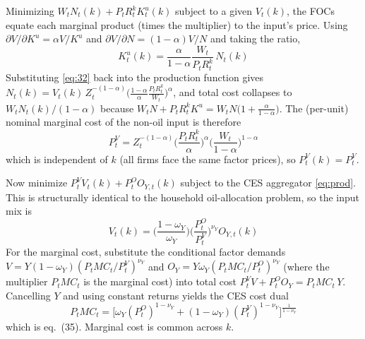 Minimizing $W_tN_t(k)+P_tR^k_tK^u_t(k)$ subject to a given $V_t(k)$, the FOCs equate each marginal
product (times the multiplier) to the input's price. Using $\partial V/\partial K^u=\alpha V/K^u$ and
$\partial V/\partial N=(1-\alpha)V/N$ and taking the ratio,
\begin{equation}\label{eq:32}
\boxed{\,K^u_t(k)=\frac{\alpha}{1-\alpha}\frac{W_t}{P_tR^k_t}\,N_t(k)\,}\tag{P-32}
\end{equation}
Substituting \eqref{eq:32} back into the production function gives
$N_t(k)=V_t(k)\,Z_t^{-(1-\alpha)}\big(\tfrac{1-\alpha}{\alpha}\tfrac{P_tR^k_t}{W_t}\big)^{\alpha}$, and
total cost collapses to $W_tN_t(k)/(1-\alpha)$ because
$W_tN+P_tR^k_tK^u=W_tN\big(1+\tfrac{\alpha}{1-\alpha}\big)$. The (per-unit) nominal marginal cost of
the non-oil input is therefore
\begin{equation}\label{eq:33}
\boxed{\,P^V_t=Z_t^{-(1-\alpha)}\Big(\frac{P_tR^k_t}{\alpha}\Big)^\alpha\Big(\frac{W_t}{1-\alpha}\Big)^{1-\alpha}\,}\tag{P-33}
\end{equation}
which is independent of $k$ (all firms face the same factor prices), so $P^V_t(k)=P^V_t$.

Now minimize $P^V_tV_t(k)+P^O_tO_{Y,t}(k)$ subject to the CES aggregator \eqref{eq:prod}. This is
structurally identical to the household oil-allocation problem, so the input mix is
\begin{equation}\label{eq:34}
\boxed{\,V_t(k)=\Big(\frac{1-\omega_Y}{\omega_Y}\Big)\Big(\frac{P^O_t}{P^V_t}\Big)^{\nu_Y}O_{Y,t}(k)\,}\tag{P-34}
\end{equation}
For the marginal cost, substitute the conditional factor demands
$V=Y(1-\omega_Y)(P_tMC_t/P^V_t)^{\nu_Y}$ and $O_Y=Y\omega_Y(P_tMC_t/P^O_t)^{\nu_Y}$ (where the
multiplier $P_tMC_t$ is the marginal cost) into total cost $P^V_tV+P^O_tO_Y=P_tMC_t\,Y$. Cancelling
$Y$ and using constant returns yields the CES cost dual
\begin{equation}\label{eq:35}
\boxed{\,P_tMC_t=\Big[\omega_Y(P^O_t)^{1-\nu_Y}+(1-\omega_Y)(P^V_t)^{1-\nu_Y}\Big]^{\frac{1}{1-\nu_Y}}\,}\tag{P-35}
\end{equation}
which is eq.\ (35). Marginal cost is common across $k$.

